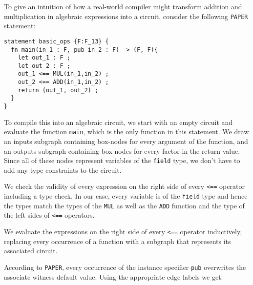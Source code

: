 \begin{example} To give an intuition of how a real-world compiler might transform addition and multiplication in algebraic expressions into a circuit, consider the following \texttt{PAPER} statement:
\begin{lstlisting}
statement basic_ops {F:F_13} {
  fn main(in_1 : F, pub in_2 : F) -> (F, F){
  	let out_1 : F ;
	let out_2 : F ;
    out_1 <== MUL(in_1,in_2) ;
    out_2 <== ADD(in_1,in_2) ;
    return (out_1, out_2) ;
  }
}
\end{lstlisting} 
To compile this into an algebraic circuit, we start with an empty circuit and evaluate the function \texttt{main}, which is the only function in this statement. We draw an inputs subgraph containing box-nodes for every argument of the function, and an outputs subgraph containing box-nodes for every factor in the return value. Since all of these nodes represent variables of the \texttt{field} type, we don't have to add any type constraints to the circuit.

We check the validity of every expression on the right side of every \texttt{<==} operator including a type check. In our case, every variable is of the \texttt{field} type and hence the types match the types of the \texttt{MUL} as well as the \texttt{ADD} function and the type of the left sides of \texttt{<==} operators. 

We evaluate the expressions on the right side of every \texttt{<==} operator inductively, replacing every occurrence of a function with a subgraph that represents its associated circuit.

According to \texttt{PAPER}, every occurrence of the instance specifier \texttt{pub} overwrites the associate witness default value. Using the appropriate edge labels we get: 
\begin{center}
\end{center}
\end{example}
